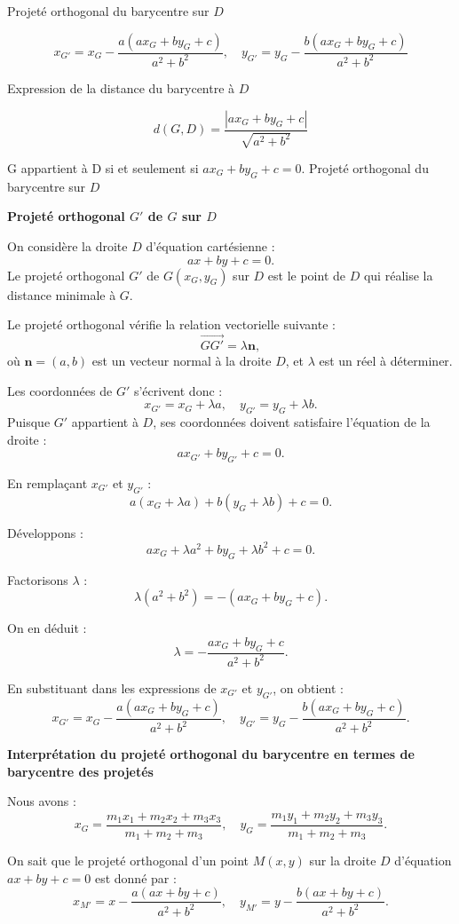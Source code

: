 \documentclass[10pt,a4paper]{article}
\begin{document}
\q Projeté orthogonal du barycentre sur $D$

$$
x_{G'} = x_G - \frac{a(ax_G + by_G + c)}{a^2 + b^2}, \quad
y_{G'} = y_G - \frac{b(ax_G + by_G + c)}{a^2 + b^2}
$$

\q Expression de la distance du barycentre à $D$

$$
d(G, D) = \frac{|ax_G + by_G + c|}{\sqrt{a^2 + b^2}}
$$

\q G appartient à D si et seulement si $ax_G + by_G + c = 0$.
\q Projeté orthogonal du barycentre sur $D$
\setcounter{ql}{0}

\q \textbf{Projeté orthogonal $G'$ de $G$ sur $D$}

On considère la droite $D$ d'équation cartésienne :
\[
ax + by + c = 0.
\]
Le projeté orthogonal $G'$ de $G(x_G, y_G)$ sur $D$ est le point de $D$ qui réalise la distance
minimale à $G$.

Le projeté orthogonal vérifie la relation vectorielle suivante :
\[
\overrightarrow{GG'} = \lambda \mathbf{n},
\]
où $\mathbf{n} = (a, b)$ est un vecteur normal à la droite $D$, et $\lambda$ est un réel à
déterminer.

Les coordonnées de $G'$ s'écrivent donc :
\[
x_{G'} = x_G + \lambda a, \quad y_{G'} = y_G + \lambda b.
\]
Puisque $G'$ appartient à $D$, ses coordonnées doivent satisfaire l'équation de la droite :
\[
a x_{G'} + b y_{G'} + c = 0.
\]

En remplaçant $x_{G'}$ et $y_{G'}$ :
\[
a (x_G + \lambda a) + b (y_G + \lambda b) + c = 0.
\]

Développons :
\[
ax_G + \lambda a^2 + by_G + \lambda b^2 + c = 0.
\]

Factorisons $\lambda$ :
\[
\lambda (a^2 + b^2) = - (ax_G + by_G + c).
\]

On en déduit :
\[
\lambda = -\frac{ax_G + by_G + c}{a^2 + b^2}.
\]

En substituant dans les expressions de $x_{G'}$ et $y_{G'}$, on obtient :
\[
x_{G'} = x_G - \frac{a(ax_G + by_G + c)}{a^2 + b^2}, \quad
y_{G'} = y_G - \frac{b(ax_G + by_G + c)}{a^2 + b^2}.
\]


\q \textbf{Interprétation du projeté orthogonal du barycentre en termes de barycentre des projetés}

Nous avons :
\[
x_G = \frac{m_1 x_1 + m_2 x_2 + m_3 x_3}{m_1 + m_2 + m_3}, \quad
y_G = \frac{m_1 y_1 + m_2 y_2 + m_3 y_3}{m_1 + m_2 + m_3}.
\]

On sait que le projeté orthogonal d'un point \( M(x,y) \) sur la droite \( D \) d'équation \( ax + by + c = 0 \) est donné par :
\[
x_{M'} = x - \frac{a(ax + by + c)}{a^2 + b^2}, \quad
y_{M'} = y - \frac{b(ax + by + c)}{a^2 + b^2}.
\]
\end{document}
